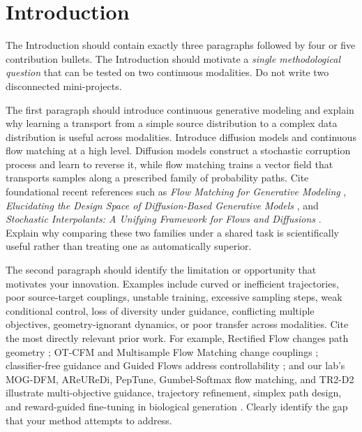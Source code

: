 \documentclass{article}
\begin{document}
\section{Introduction}

The Introduction should contain exactly three paragraphs followed by four or five contribution bullets. The Introduction should motivate a \emph{single methodological question} that can be tested on two continuous modalities. Do not write two disconnected mini-projects.

The first paragraph should introduce continuous generative modeling and explain why learning a transport from a simple source distribution to a complex data distribution is useful across modalities. Introduce diffusion models and continuous flow matching at a high level. Diffusion models construct a stochastic corruption process and learn to reverse it, while flow matching trains a vector field that transports samples along a prescribed family of probability paths. Cite foundational recent references such as \emph{Flow Matching for Generative Modeling} \citep{lipman2022flow}, \emph{Elucidating the Design Space of Diffusion-Based Generative Models} \citep{karras2022elucidating}, and \emph{Stochastic Interpolants: A Unifying Framework for Flows and Diffusions} \citep{albergo2025stochastic}. Explain why comparing these two families under a shared task is scientifically useful rather than treating one as automatically superior.

The second paragraph should identify the limitation or opportunity that motivates your innovation. Examples include curved or inefficient trajectories, poor source-target couplings, unstable training, excessive sampling steps, weak conditional control, loss of diversity under guidance, conflicting multiple objectives, geometry-ignorant dynamics, or poor transfer across modalities. Cite the most directly relevant prior work. For example, Rectified Flow changes path geometry \citep{liu2022flow}; OT-CFM and Multisample Flow Matching change couplings \citep{tong2023improving,pooladian2023multisample}; classifier-free guidance and Guided Flows address controllability \citep{ho2022classifier,zheng2023guided}; and our lab's MOG-DFM, AReUReDi, PepTune, Gumbel-Softmax flow matching, and TR2-D2 illustrate multi-objective guidance, trajectory refinement, simplex path design, and reward-guided fine-tuning in biological generation \citep{chen2025multi,chen2025areuredi,tang2025peptune,tang2025gumbel,tang2025tr2}. Clearly identify the gap that your method attempts to address.
\end{document}
